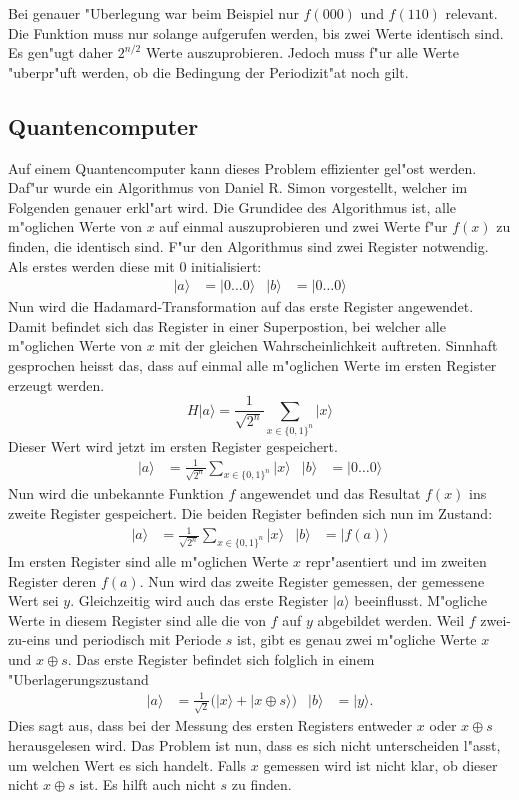 \begin{refsection}
Bei genauer "Uberlegung war beim Beispiel nur $f(000)$ und $f(110)$ relevant.
Die Funktion muss nur solange aufgerufen werden, bis zwei Werte identisch sind.
Es gen"ugt daher $2^{n/2}$ Werte auszuprobieren.
Jedoch muss f"ur alle Werte "uberpr"uft werden, ob die Bedingung der
Periodizit"at noch gilt.

\subsection{Quantencomputer}

Auf einem Quantencomputer kann dieses Problem effizienter gel"ost werden.
Daf"ur wurde ein Algorithmus von Daniel R. Simon vorgestellt, welcher im
Folgenden genauer erkl"art wird.
Die Grundidee des Algorithmus ist, alle m"oglichen Werte von $x$ auf einmal
auszuprobieren und zwei Werte f"ur $f(x)$ zu finden, die identisch sind.
F"ur den Algorithmus sind zwei Register notwendig. Als erstes werden diese mit
0 initialisiert:
\begin{align*}
  |a\rangle&=|0 \dots 0 \rangle 
  &
  |b\rangle&=|0 \dots 0 \rangle 
\end{align*}
Nun wird die Hadamard-Transformation auf das erste Register angewendet. Damit
befindet sich das Register in einer Superpostion, bei welcher alle m"oglichen
Werte von $x$ mit der gleichen Wahrscheinlichkeit auftreten. Sinnhaft
gesprochen heisst das, dass auf einmal alle m"oglichen Werte im ersten Register
erzeugt werden.
\[ 
    H|a\rangle=\frac{1}{\sqrt{2^n}} \sum_{x\in\{0,1\}^n}{|x\rangle}
\]
Dieser Wert wird jetzt im ersten Register gespeichert.
\begin{align*}
  |a\rangle &= \frac{1}{\sqrt{2^n}} \sum_{x\in\{0,1\}^n} {|x\rangle} &
  |b\rangle&=|0 \dots 0 \rangle 
\end{align*}
Nun wird die unbekannte Funktion $f$ angewendet und das Resultat $f(x)$ ins
zweite Register gespeichert. Die beiden Register befinden sich nun im Zustand:
\begin{align*}
  |a\rangle &= \frac{1}{\sqrt{2^n}} \sum_{x\in\{0,1\}^n} {|x\rangle} &
  |b\rangle &= |f(a)\rangle
\end{align*}
Im ersten Register sind alle m"oglichen Werte $x$ repr"asentiert und im zweiten
Register deren $f(a)$. Nun wird das zweite Register gemessen, der gemessene Wert
sei $y$. 
Gleichzeitig wird auch das erste Register $|a\rangle$ beeinflusst.
M"ogliche Werte in diesem Register sind alle die von $f$ auf $y$ abgebildet
werden. Weil $f$ zwei-zu-eins und periodisch mit Periode $s$ ist, gibt es genau zwei
m"ogliche Werte $x$ und $x \oplus s$. Das erste Register befindet sich folglich
in einem "Uberlagerungszustand
\begin{align*}
  |a\rangle &= \frac{1}{\sqrt{2}} \bigl( |x\rangle + |x \oplus s \rangle \bigr)
  &
  |b\rangle &= |y\rangle.
\end{align*}
Dies sagt aus, dass bei der Messung des ersten Registers entweder $x$ oder $x
\oplus s$ herausgelesen wird. Das Problem ist nun, dass es sich nicht
unterscheiden l"asst, um welchen Wert es sich handelt.
Falls $x$ gemessen wird ist nicht klar, ob dieser nicht $x \oplus s$ ist. 
Es hilft auch nicht $s$ zu finden.


\end{refsection}
